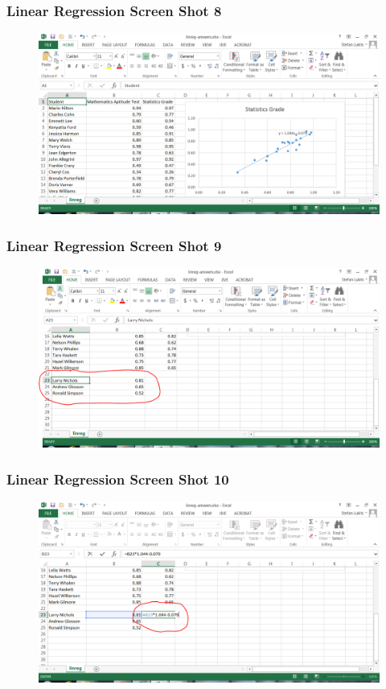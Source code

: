 \documentclass[xcolor=dvipsnames]{beamer}
\begin{document}
\begin{frame}
  \frametitle{Linear Regression Screen Shot 8}
  \begin{figure}[h]
    \includegraphics[scale=.42]{./linreg10.png}
  \end{figure}
\end{frame}

\begin{frame}
  \frametitle{Linear Regression Screen Shot 9}
  \begin{figure}[h]
    \includegraphics[scale=.42]{./linreg11.png}
  \end{figure}
\end{frame}

\begin{frame}
  \frametitle{Linear Regression Screen Shot 10}
  \begin{figure}[h]
    \includegraphics[scale=.42]{./linreg12.png}
  \end{figure}
\end{frame}
\end{document}
